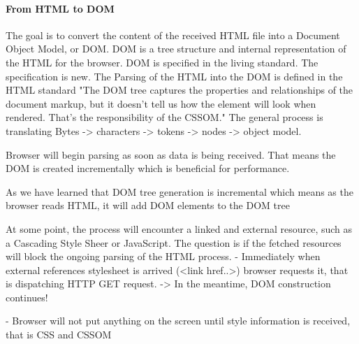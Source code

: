 

\paragraph{From HTML to DOM}


The goal is to convert the content of the received HTML file into a Document Object Model, or DOM.
DOM is a tree structure and internal representation of the HTML for the browser. %
DOM is specified in the living standard. %
The specification is new.
The Parsing of the HTML into the DOM is defined in the HTML standard %
"The DOM tree captures the properties and relationships of the document markup, but it doesn't tell us how the element will look when rendered. 
That’s the responsibility of the CSSOM."
The general process is translating Bytes -> characters -> tokens -> nodes -> object model. %



Browser will begin parsing as soon as data is being received. %
That means the DOM is created incrementally which is beneficial for performance.

As we have learned that DOM tree generation is incremental which means as the browser reads HTML, it will add DOM elements to the DOM tree



At some point, the process will encounter a linked and external resource, such as a Cascading Style Sheer or JavaScript.
The question is if the fetched resources will block the ongoing parsing of the HTML process.
- Immediately when external references stylesheet is arrived (<link href..>) browser requests it, that is dispatching HTTP GET request.
-> In the meantime, DOM construction continues!

- Browser will not put anything on the screen until style information is received, that is CSS and CSSOM



